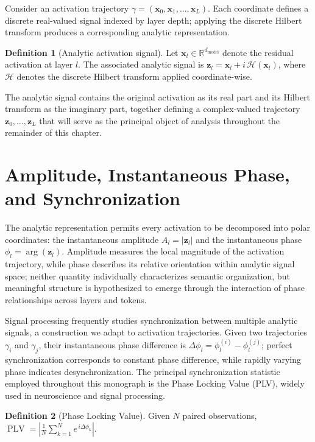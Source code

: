 \documentclass[11pt,twoside,openright]{book}
\numberwithin{equation}{chapter}
\theoremstyle{definition}
\newtheorem{definition}{Definition}[chapter]
\theoremstyle{plain}
\theoremstyle{remark}
\theoremstyle{definition}
\begin{document}
Consider an activation trajectory
$\gamma=(\mathbf{x}_0,\mathbf{x}_1,\ldots,\mathbf{x}_L)$. Each coordinate
defines a discrete real-valued signal indexed by layer depth; applying
the discrete Hilbert transform produces a corresponding analytic
representation.

\begin{definition}[Analytic activation signal]
Let $\mathbf{x}_l\in\mathbb{R}^{d_{\mathrm{model}}}$ denote the residual
activation at layer $l$. The associated analytic signal is
$\mathbf{z}_l=\mathbf{x}_l+i\,\mathcal{H}(\mathbf{x}_l)$, where
$\mathcal{H}$ denotes the discrete Hilbert transform applied
coordinate-wise.
\end{definition}

The analytic signal contains the original activation as its real part and
its Hilbert transform as the imaginary part, together defining a
complex-valued trajectory $\mathbf{z}_0,\ldots,\mathbf{z}_L$ that will
serve as the principal object of analysis throughout the remainder of
this chapter.

\section{Amplitude, Instantaneous Phase, and Synchronization}

The analytic representation permits every activation to be decomposed
into polar coordinates: the instantaneous amplitude $A_l=|\mathbf{z}_l|$
and the instantaneous phase $\phi_l=\arg(\mathbf{z}_l)$. Amplitude
measures the local magnitude of the activation trajectory, while phase
describes its relative orientation within analytic signal space; neither
quantity individually characterizes semantic organization, but meaningful
structure is hypothesized to emerge through the interaction of phase
relationships across layers and tokens.

Signal processing frequently studies synchronization between multiple
analytic signals, a construction we adapt to activation trajectories.
Given two trajectories $\gamma_i$ and $\gamma_j$, their instantaneous
phase difference is $\Delta\phi_l=\phi_l^{(i)}-\phi_l^{(j)}$; perfect
synchronization corresponds to constant phase difference, while rapidly
varying phase indicates desynchronization. The principal synchronization
statistic employed throughout this monograph is the Phase Locking Value
(PLV), widely used in neuroscience and signal processing.

\begin{definition}[Phase Locking Value]
Given $N$ paired observations,
$\operatorname{PLV}=\left|\frac1N\sum_{k=1}^{N}e^{\,i\Delta\phi_k}\right|$.
\end{definition}
\end{document}
